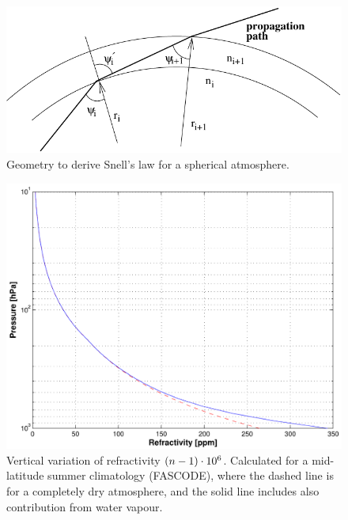 \label{sec:ppath:refr1D}
\begin{figure}[!p]
  \begin{center}
    \includegraphics*{Figs/ppath/snell}
    \caption{Geometry to derive Snell's law for a spherical atmosphere. }
    \label{fig:ppath:snell} 
  \end{center} 
\end{figure}
\begin{figure}[!p]
 \begin{center}
  \includegraphics*[width=0.80\hsize]{Figs/ppath/ppath_N}
  \caption{Vertical variation of refractivity $(n-1)\cdot10^{6}$.
     Calculated for a mid-latitude summer climatology (FASCODE), where
     the dashed line is for a completely dry atmosphere, and the solid line
     includes also contribution from water vapour.}
  \label{fig:ppath:N}  
 \end{center}
\end{figure}

